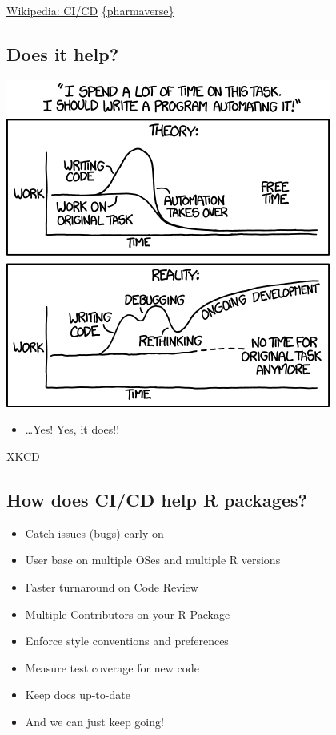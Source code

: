 \documentclass[
  letterpaper,
  DIV=11,
  numbers=noendperiod]{scrartcl}
\providecommand{\tightlist}{%
  \setlength{\itemsep}{0pt}\setlength{\parskip}{0pt}}\usepackage{longtable,booktabs,array}
\begin{document}
\href{https://en.wikipedia.org/wiki/CI/CD\#cite_note-2}{Wikipedia:
CI/CD} \href{https://github.com/pharmaverse}{\{pharmaverse\}}

\hypertarget{does-it-help}{%
\subsection{Does it help?}\label{does-it-help}}

\includegraphics{automation.png}

\begin{itemize}
\tightlist
\item
  \ldots Yes! Yes, it does!!
\end{itemize}

\href{https://xkcd.com/1319/}{XKCD}

\hypertarget{how-does-cicd-help-r-packages}{%
\subsection{How does CI/CD help R
packages?}\label{how-does-cicd-help-r-packages}}

\begin{itemize}
\tightlist
\item
  Catch issues (bugs) early on
\item
  User base on multiple OSes and multiple R versions
\item
  Faster turnaround on Code Review
\item
  Multiple Contributors on your R Package
\item
  Enforce style conventions and preferences
\item
  Measure test coverage for new code
\item
  Keep docs up-to-date
\item
  And we can just keep going!
\end{itemize}
\end{document}
